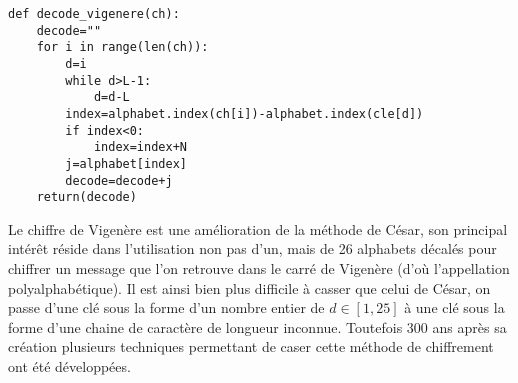 \question{}

\begin{center}
\begin{lstlisting}
def decode_vigenere(ch):
    decode=""
    for i in range(len(ch)):
        d=i
        while d>L-1:
            d=d-L
        index=alphabet.index(ch[i])-alphabet.index(cle[d])
        if index<0:
            index=index+N
        j=alphabet[index]
        decode=decode+j
    return(decode)
\end{lstlisting}
\end{center}

\question{}

Le chiffre de Vigenère est une amélioration de la méthode de César, son principal intérêt réside dans l'utilisation non pas d'un, mais de 26 alphabets  décalés pour chiffrer un message que l'on retrouve dans le carré de Vigenère (d'où l'appellation polyalphabétique). Il est ainsi bien plus difficile à casser que celui de César, on passe d'une clé sous la forme d'un nombre entier de $d\in\left[1,25\right]$ à une clé sous la forme d'une chaine de caractère de longueur inconnue. Toutefois 300 ans après sa création plusieurs techniques permettant de caser cette méthode de chiffrement ont été développées.




